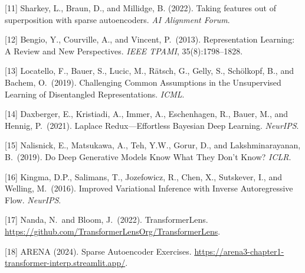 \documentclass{article}
\begin{document}
{[11] Sharkey, L., Braun, D., and Millidge, B. (2022). Taking features out of superposition with sparse autoencoders. \textit{AI Alignment Forum}.

[12] Bengio, Y., Courville, A., and Vincent, P.\ (2013). Representation Learning: A Review and New Perspectives. \textit{IEEE TPAMI}, 35(8):1798--1828.

[13] Locatello, F., Bauer, S., Lucic, M., R\"{a}tsch, G., Gelly, S., Sch\"{o}lkopf, B., and Bachem, O.\ (2019). Challenging Common Assumptions in the Unsupervised Learning of Disentangled Representations. \textit{ICML}.

[14] Daxberger, E., Kristiadi, A., Immer, A., Eschenhagen, R., Bauer, M., and Hennig, P.\ (2021). Laplace Redux---Effortless Bayesian Deep Learning. \textit{NeurIPS}.

[15] Nalisnick, E., Matsukawa, A., Teh, Y.W., Gorur, D., and Lakshminarayanan, B.\ (2019). Do Deep Generative Models Know What They Don't Know? \textit{ICLR}.

[16] Kingma, D.P., Salimans, T., Jozefowicz, R., Chen, X., Sutskever, I., and Welling, M.\ (2016). Improved Variational Inference with Inverse Autoregressive Flow. \textit{NeurIPS}.

[17] Nanda, N.\ and Bloom, J.\ (2022). TransformerLens. \url{https://github.com/TransformerLensOrg/TransformerLens}.

[18] ARENA (2024). Sparse Autoencoder Exercises. \url{https://arena3-chapter1-transformer-interp.streamlit.app/}.

}
\end{document}
